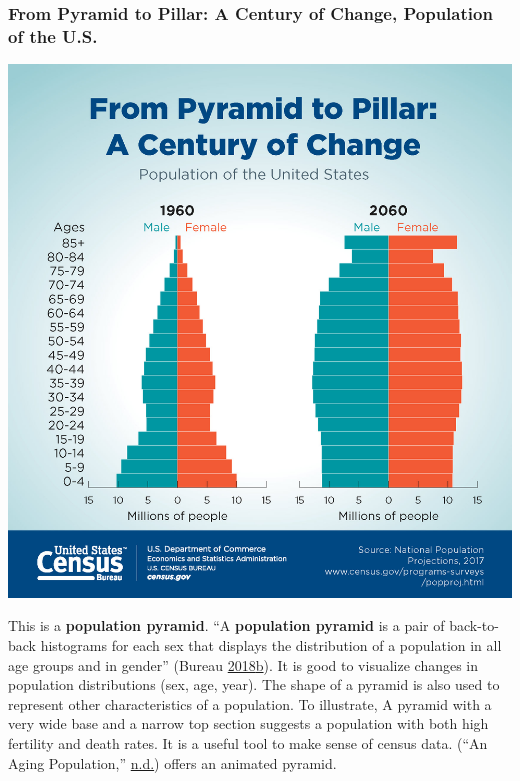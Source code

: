 \documentclass[]{book}
\begin{document}
\hypertarget{from-pyramid-to-pillar-a-century-of-change-population-of-the-u.s.}{%
\subsubsection{From Pyramid to Pillar: A Century of Change, Population of the U.S.}\label{from-pyramid-to-pillar-a-century-of-change-population-of-the-u.s.}}

\includegraphics{images/Pyramid.jpg}

This is a \textbf{population pyramid}. ``A \textbf{population pyramid} is a pair of back-to-back histograms for each sex that displays the distribution of a population in all age groups and in gender'' (Bureau \protect\hyperlink{ref-population_pyramid}{2018}\protect\hyperlink{ref-population_pyramid}{b}). It is good to visualize changes in population distributions (sex, age, year). The shape of a pyramid is also used to represent other characteristics of a population. To illustrate, A pyramid with a very wide base and a narrow top section suggests a population with both high fertility and death rates. It is a useful tool to make sense of census data. (``An Aging Population,'' \protect\hyperlink{ref-animated_pyramid}{n.d.}) offers an animated pyramid.
\end{document}
